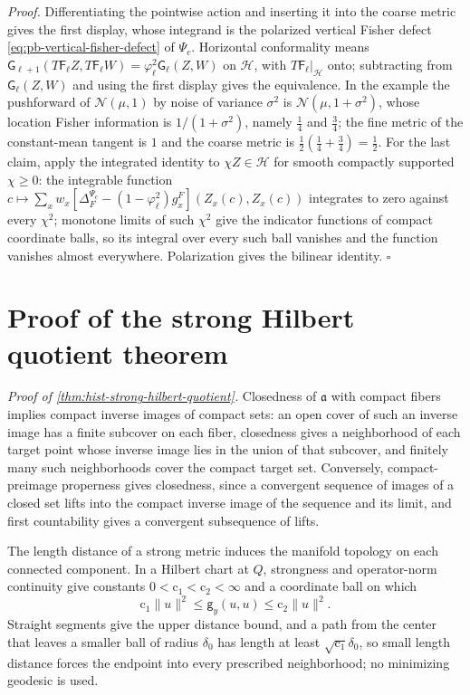 \noindent\emph{Proof.}
Differentiating the pointwise action and inserting it into the coarse metric
gives the first display, whose integrand is the polarized vertical Fisher
defect \eqref{eq:pb-vertical-fisher-defect} of \(\Psi_c\). Horizontal
conformality means
\(\mathsf G_{\ell+1}(T\mathsf F_\ell Z,T\mathsf F_\ell W)=\varphi_\ell^2\mathsf G_\ell(Z,W)\)
on \(\mathcal H\), with \(T\mathsf F_\ell|_{\mathcal H}\) onto; subtracting from
\(\mathsf G_\ell(Z,W)\) and using the first display gives the equivalence. In the
example the pushforward of \(\mathcal N(\mu,1)\) by noise of variance \(\sigma^2\)
is \(\mathcal N(\mu,1+\sigma^2)\), whose location Fisher information is
\(1/(1+\sigma^2)\), namely \(\tfrac14\) and \(\tfrac34\); the fine metric of the
constant-mean tangent is \(1\) and the coarse metric is
\(\tfrac12(\tfrac14+\tfrac34)=\tfrac12\). For the last claim, apply the
integrated identity to \(\chi Z\in\mathcal H\) for smooth compactly supported
\(\chi\geq0\): the integrable function
\(c\mapsto\sum_xw_x[\Delta_F^{\Psi_c}-(1-\varphi_\ell^2)g^F_x](Z_x(c),Z_x(c))\)
integrates to zero against every \(\chi^2\); monotone limits of such \(\chi^2\)
give the indicator functions of compact coordinate balls, so its integral over
every such ball vanishes and the function vanishes almost everywhere.
Polarization gives the bilinear identity. \(\square\)

\section{Proof of the strong Hilbert quotient theorem}
\label{sec:hist-strong-hilbert-quotient-proof}

\noindent\emph{Proof of \cref{thm:hist-strong-hilbert-quotient}.}
Closedness of \(\mathfrak a\) with compact fibers implies compact inverse images
of compact sets: an open cover of such an inverse image has a finite subcover on
each fiber, closedness gives a neighborhood of each target point whose inverse
image lies in the union of that subcover, and finitely many such neighborhoods
cover the compact target set. Conversely, compact-preimage properness gives
closedness, since a convergent sequence of images of a closed set lifts into the
compact inverse image of the sequence and its limit, and first countability
gives a convergent subsequence of lifts.

The length distance of a strong metric induces the manifold topology on each
connected component. In a Hilbert chart at \(Q\), strongness and operator-norm
continuity give constants \(0<\mathrm c_1<\mathrm c_2<\infty\) and a coordinate
ball on which
\begin{equation}
\mathrm c_1\|u\|^2\leq\mathsf g_y(u,u)\leq\mathrm c_2\|u\|^2.
\label{eq:hist-strong-chart-bounds}
\end{equation}
Straight segments give the upper distance bound, and a path from the center that
leaves a smaller ball of radius \(\delta_0\) has length at least
\(\sqrt{\mathrm c_1}\delta_0\),
so small length distance forces the endpoint into every prescribed
neighborhood; no minimizing geodesic is used.

